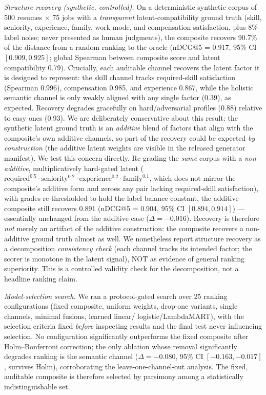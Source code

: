 \emph{Structure recovery (synthetic, controlled).} On a deterministic synthetic corpus of 500 resumes
$\times$ 75 jobs with a \emph{transparent} latent-compatibility ground truth (skill, seniority,
experience, family, work-mode, and compensation satisfaction, plus 8\% label noise; never presented
as human judgments), the composite recovers 90.7\% of the distance from a random ranking to the
oracle (nDCG@5 = 0.917, 95\% CI $[0.909, 0.925]$; global Spearman between composite score and latent
compatibility 0.79). Crucially, each auditable channel recovers the latent factor it is designed to
represent: the skill channel tracks required-skill satisfaction (Spearman 0.996), compensation 0.985,
and experience 0.867, while the holistic semantic channel is only weakly aligned with any single
factor (0.39), as expected. Recovery degrades gracefully on hard/adversarial profiles (0.88) relative
to easy ones (0.93).
We are deliberately conservative about this result: the synthetic latent ground truth is an \emph{additive}
blend of factors that align with the composite's own additive channels, so part of the recovery could be
expected \emph{by construction} (the additive latent weights are visible in the released generator manifest).
We test this concern directly. Re-grading the \emph{same} corpus with a \emph{non-additive}, multiplicatively
hard-gated latent ($\text{required}^{0.5}\cdot\text{seniority}^{0.2}\cdot\text{experience}^{0.2}\cdot
\text{family}^{0.1}$, which does not mirror the composite's additive form and zeroes any pair lacking
required-skill satisfaction), with grades re-thresholded to hold the label balance constant, the additive
composite still recovers 0.891 (nDCG@5 = 0.904, 95\% CI $[0.894, 0.914]$) --- essentially unchanged from the
additive case ($\Delta = -0.016$). Recovery is therefore \emph{not} merely an artifact of the additive
construction: the composite recovers a non-additive ground truth almost as well. We nonetheless report
structure recovery as a decomposition \emph{consistency check} (each channel tracks its intended factor; the
scorer is monotone in the latent signal), NOT as evidence of general ranking superiority. This is a
controlled validity check for the decomposition, not a headline ranking claim.

\emph{Model-selection search.} We ran a protocol-gated search over 25 ranking configurations (fixed
composite, uniform weights, drop-one variants, single channels, minimal fusions, learned linear/
logistic/LambdaMART), with the selection criteria fixed \emph{before} inspecting results and the
final test never influencing selection. No configuration significantly outperforms the fixed
composite after Holm--Bonferroni correction; the only ablation whose removal significantly degrades
ranking is the semantic channel ($\Delta = -0.080$, 95\% CI $[-0.163, -0.017]$, survives Holm),
corroborating the leave-one-channel-out analysis. The fixed, auditable composite is therefore
selected by parsimony among a statistically indistinguishable set.

